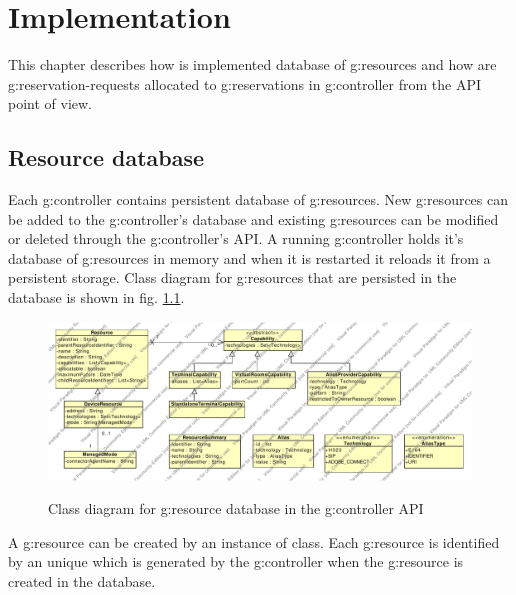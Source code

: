 \chapter{Implementation}

This chapter describes how is implemented database of \glspl{g:resource} and how are \glspl{g:reservation-request} allocated to \glspl{g:reservation} in \gls{g:controller} from the API point of view.

\section{Resource database}

Each \gls{g:controller} contains persistent database of \glspl{g:resource}. New \glspl{g:resource} can be added to the \gls{g:controller}'s database and existing \glspl{g:resource} can be modified or deleted through the \gls{g:controller}'s API. A running \gls{g:controller} holds it's database of \glspl{g:resource} in memory and when it is restarted it reloads it from a persistent storage. Class diagram for \glspl{g:resource} that are persisted in the database is shown in fig. \ref{fig:cd_resources}.

\begin{figure}[ht!]
\includegraphics[width=\textwidth]{diagrams/cd_resources_api}
\label{fig:cd_resources}
\caption{Class diagram for \gls{g:resource} database in the \gls{g:controller} API}
\end{figure}

A \gls{g:resource} can be created by an instance of  class. Each \gls{g:resource} is identified by an unique  which is generated by the \gls{g:controller} when the \gls{g:resource} is created in the database.
